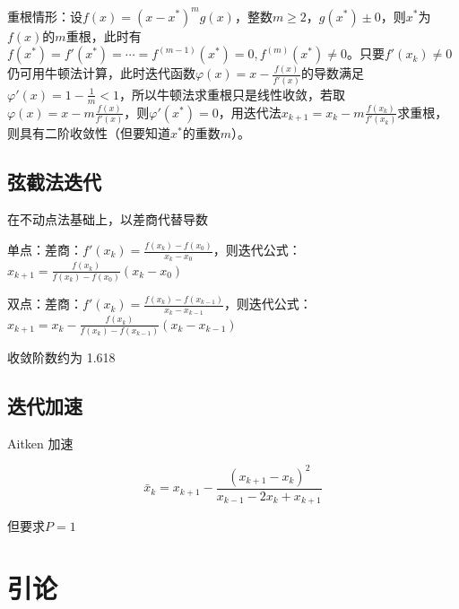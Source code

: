 \documentclass[UTF8,a4paper,11pt,oneside]{ctexbook}
\begin{document}
重根情形：设\(f(x)=(x-x^*)^mg(x)\)，整数\(m\geq2\)，\(g(x^*)\pm0\)，则\(x^*\)为\(f(x)\)的\(m\)重根，此时有\(f(x^*)=f'(x^*)=\cdots=f^{(m-1)}(x^*)=0,f^{(m)}(x^*)\neq0\)。只要\(f'(x_k)\neq0\)仍可用牛顿法计算，此时迭代函数\(\varphi(x)=x-\frac{f(x)}{f'(x)}\)的导数满足\(\varphi'(x)=1-\frac{1}{m}<1\)，所以牛顿法求重根只是线性收敛，若取\(\varphi(x)=x-m\frac{f(x)}{f'(x)}\)，则\(\varphi'(x^*)=0\)，用迭代法\(x_{k+1}=x_k-m\frac{f(x_k)}{f'(x_k)}\)求重根，则具有二阶收敛性（但要知道\(x^*\)的重数\(m\)）。

\section{弦截法迭代}

在不动点法基础上，以差商代替导数

单点：差商：\(f'(x_k)=\frac{f(x_k)-f(x_0)}{x_k-x_0}\)，则迭代公式：\(x_{k+1}=\frac{f(x_k)}{f(x_k)-f(x_0)}(x_k-x_0)\)

双点：差商：\(f'(x_k)=\frac{f(x_k)-f(x_{k-1})}{x_k-x_{k-1}}\)，则迭代公式：\(x_{k+1}=x_k-\frac{f(x_k)}{f(x_k)-f(x_{k-1})}(x_k-x_{k-1})\)

收敛阶数约为 1.618

\section{迭代加速}

Aitken 加速

\[
\bar{x}_k=x_{k+1}-\frac{(x_{k+1}-x_k)^2}{x_{k-1}-2x_k+x_{k+1}}
\]

但要求\(P=1\)



\appendix

\chapter{引论}
\end{document}
